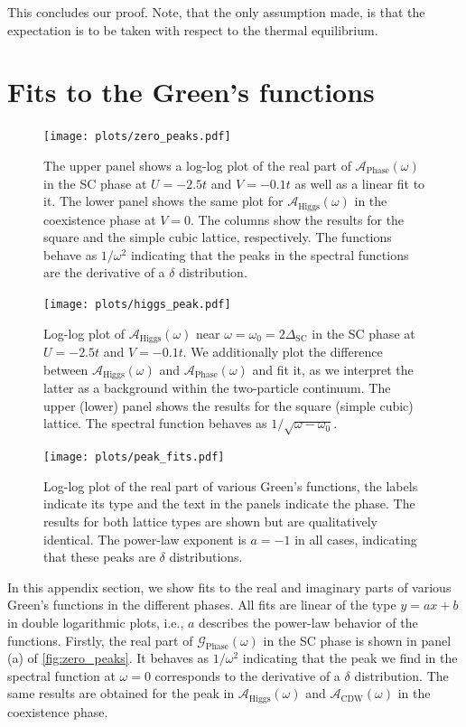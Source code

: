 \documentclass[
    reprint, 
    aps,
    preprintnumbers,
    twocolumn,
    prb,
    superscriptaddress
]{revtex4-2}
\newcommand{\greens}[1]{\mathcal{G}_\text{#1} (\omega)}
\newcommand{\spectral}[1]{\mathcal{A}_\text{#1}  (\omega)}
\begin{document}
This concludes our proof. Note, that the only assumption made, is that the expectation is to be taken with respect to the thermal equilibrium.


\section{Fits to the Green's functions}
\label{sec:fit_greens_functions}

\begin{figure}
    \centering
    \texttt{[image: plots/zero\_peaks.pdf]}
    \caption{The upper panel shows a log-log plot of the real part of $\spectral{Phase}$ in the SC phase at $U=-2.5t$ and $V=-0.1t$ as well as a linear fit to it.
    The lower panel shows the same plot for $\spectral{Higgs}$ in the coexistence phase at $V=0$. The columns show the results for the square and the simple cubic lattice, respectively.
    The functions behave as $1/\omega^2$ indicating that the peaks in the spectral functions are the derivative of a $\delta$ distribution.}
    \label{fig:zero_peaks}
\end{figure}

\begin{figure}
    \centering
    \texttt{[image: plots/higgs\_peak.pdf]}
    \caption{Log-log plot of $\spectral{Higgs}$ near $\omega = \omega_0 = 2\Delta_\text{SC}$ in the SC phase at $U=-2.5t$ and $V=-0.1t$.
    We additionally plot the difference between $\spectral{Higgs}$ and $\spectral{Phase}$ and fit it, as we interpret the latter as a background within the two-particle continuum.
    The upper (lower) panel shows the results for the square (simple cubic) lattice.
    The spectral function behaves as $1 / \sqrt{\omega - \omega_0}$.}
    \label{fig:higgs_peak}
\end{figure}

\begin{figure}
    \centering
    \texttt{[image: plots/peak\_fits.pdf]}
    \caption{Log-log plot of the real part of various Green's functions, the labels indicate its type and the text in the panels indicate the phase.
        The results for both lattice types are shown but are qualitatively identical.
        The power-law exponent is $a=-1$ in all cases, indicating that these peaks are $\delta$ distributions.}
        \label{fig:peak_fits}
\end{figure}

In this appendix section, we show fits to the real and imaginary parts of various Green's functions in the different phases.
All fits are linear of the type $y = ax + b$ in double logarithmic plots, i.e., $a$ describes the power-law behavior of the functions.
Firstly, the real part of $\greens{Phase}$ in the SC phase is shown in panel (a) of \autoref{fig:zero_peaks}.
It behaves as $1/\omega^2$ indicating that the peak we find in the spectral function at $\omega=0$ corresponds to the derivative of a $\delta$ distribution.
The same results are obtained for the peak in $\spectral{Higgs}$ and $\spectral{CDW}$ in the coexistence phase.
\end{document}
